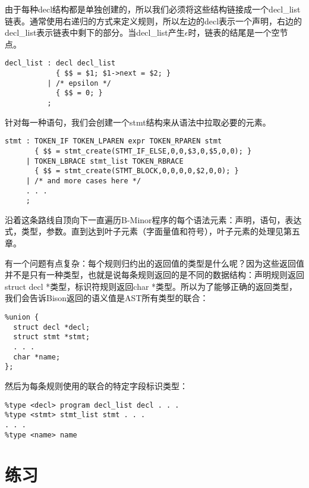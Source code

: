 \documentclass[cn,11pt,chinese]{elegantbook}
\begin{document}
由于每种decl结构都是单独创建的，所以我们必须将这些结构链接成一个decl\_list链表。通常使用右递归的方式来定义规则，所以左边的decl表示一个声明，右边的decl\_list表示链表中剩下的部分。当decl\_list产生$\epsilon$时，链表的结尾是一个空节点。

\begin{verbatim}
decl_list : decl decl_list
            { $$ = $1; $1->next = $2; }
          | /* epsilon */
            { $$ = 0; }
          ;
\end{verbatim}

针对每一种语句，我们会创建一个stmt结构来从语法中拉取必要的元素。

\begin{verbatim}
stmt : TOKEN_IF TOKEN_LPAREN expr TOKEN_RPAREN stmt
       { $$ = stmt_create(STMT_IF_ELSE,0,0,$3,0,$5,0,0); }
     | TOKEN_LBRACE stmt_list TOKEN_RBRACE
       { $$ = stmt_create(STMT_BLOCK,0,0,0,0,$2,0,0); }
     | /* and more cases here */
     . . .
     ;
\end{verbatim}

沿着这条路线自顶向下一直遍历B-Minor程序的每个语法元素：声明，语句，表达式，类型，参数。直到达到叶子元素（字面量值和符号），叶子元素的处理见第五章。

有一个问题有点复杂：每个规则归约出的返回值的类型是什么呢？因为这些返回值并不是只有一种类型，也就是说每条规则返回的是不同的数据结构：声明规则返回struct decl *类型，标识符规则返回char *类型。所以为了能够正确的返回类型，我们会告诉Bison返回的语义值是AST所有类型的联合：

\begin{verbatim}
%union {
  struct decl *decl;
  struct stmt *stmt;
  . . .
  char *name;
};
\end{verbatim}

然后为每条规则使用的联合的特定字段标识类型：

\begin{verbatim}
%type <decl> program decl_list decl . . .
%type <stmt> stmt_list stmt . . .
. . .
%type <name> name
\end{verbatim}

\section{练习}
\end{document}
